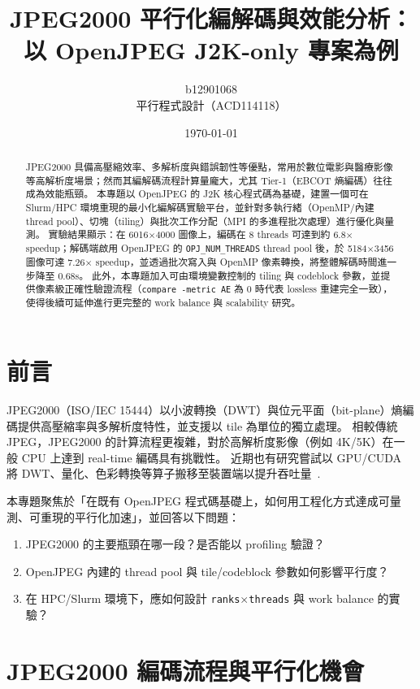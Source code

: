 \documentclass[UTF8,a4paper,12pt]{ctexart}
\title{JPEG2000 平行化編解碼與效能分析：以 OpenJPEG J2K-only 專案為例}
\author{b12901068\\
平行程式設計（ACD114118）}
\date{\today}
\begin{document}
\maketitle

\begin{abstract}
JPEG2000 具備高壓縮效率、多解析度與錯誤韌性等優點，常用於數位電影與醫療影像等高解析度場景；然而其編解碼流程計算量龐大，尤其 Tier-1（EBCOT 熵編碼）往往成為效能瓶頸。
本專題以 OpenJPEG 的 J2K 核心程式碼為基礎，建置一個可在 Slurm/HPC 環境重現的最小化編解碼實驗平台，並針對多執行緒（OpenMP/內建 thread pool）、切塊（tiling）與批次工作分配（MPI 的多進程批次處理）進行優化與量測。
實驗結果顯示：在 6016$\times$4000 圖像上，編碼在 8 threads 可達到約 6.8$\times$ speedup；解碼端啟用 OpenJPEG 的 \texttt{OPJ\_NUM\_THREADS} thread pool 後，於 5184$\times$3456 圖像可達 7.26$\times$ speedup，並透過批次寫入與 OpenMP 像素轉換，將整體解碼時間進一步降至 0.68s。
此外，本專題加入可由環境變數控制的 tiling 與 codeblock 參數，並提供像素級正確性驗證流程（\texttt{compare -metric AE} 為 0 時代表 lossless 重建完全一致），使得後續可延伸進行更完整的 work balance 與 scalability 研究。
\end{abstract}

\tableofcontents
\newpage

\section{前言}
JPEG2000（ISO/IEC 15444）以小波轉換（DWT）與位元平面（bit-plane）熵編碼提供高壓縮率與多解析度特性，並支援以 tile 為單位的獨立處理。
相較傳統 JPEG，JPEG2000 的計算流程更複雜，對於高解析度影像（例如 4K/5K）在一般 CPU 上達到 real-time 編碼具有挑戰性。
近期也有研究嘗試以 GPU/CUDA 將 DWT、量化、色彩轉換等算子搬移至裝置端以提升吞吐量~\cite{lee_cuda_j2k}.

本專題聚焦於「在既有 OpenJPEG 程式碼基礎上，如何用工程化方式達成可量測、可重現的平行化加速」，並回答以下問題：
\begin{enumerate}[label=(\arabic*)]
  \item JPEG2000 的主要瓶頸在哪一段？是否能以 profiling 驗證？
  \item OpenJPEG 內建的 thread pool 與 tile/codeblock 參數如何影響平行度？
  \item 在 HPC/Slurm 環境下，應如何設計 \texttt{ranks$\times$threads} 與 work balance 的實驗？
\end{enumerate}

\section{JPEG2000 編碼流程與平行化機會}
\end{document}
